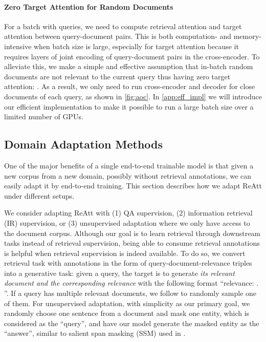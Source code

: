 \documentclass[11pt, dvipsnames]{article}
\newcommand{\ours}{ReAtt\xspace}
\begin{document}
\paragraph{Zero Target Attention for Random Documents}
For a batch with  queries, we need to compute retrieval attention and target attention between  query-document pairs.
This is both computation- and memory-intensive when batch size is large, especially for target attention because it requires  layers of joint encoding of query-document pairs in the cross-encoder.
To alleviate this, we make a simple and effective assumption that in-batch random documents are not relevant to the current query thus having zero target attention: .
As a result, we only need to run cross-encoder and decoder for  close documents of each query, as shown in \autoref{fig:aoc}.
In \autoref{app:eff_impl} we will introduce our efficient implementation to make it possible to run a large batch size over a limited number of GPUs.

\subsection{Domain Adaptation Methods}
One of the major benefits of a single end-to-end trainable model is that given a new corpus from a new domain, possibly without retrieval annotations, we can easily adapt it by end-to-end training. This section describes how we adapt \ours under different setups.

We consider adapting \ours with (1) QA supervision, (2) information retrieval (IR) supervision, or (3) unsupervised adaptation where we only have access to the document corpus.
Although our goal is to learn retrieval through downstream tasks instead of retrieval supervision, being able to consume retrieval annotations is helpful when retrieval supervision is indeed available.
To do so, we convert retrieval task with annotations in the form of query-document-relevance triples  into a generative task: given a query, the target is to generate \emph{its relevant document and the corresponding relevance} with the following format ``relevance: . ''.
If a query has multiple relevant documents, we follow \citet{fid-2021-izacard} to randomly sample one of them.
For unsupervised adaptation, with simplicity as our primary goal, we randomly choose one sentence from a document and mask one entity, which is considered as the ``query'', and have our model generate the masked entity as the ``answer'', similar to salient span masking (SSM) used in \citet{realm-2020-guu}.
\end{document}
